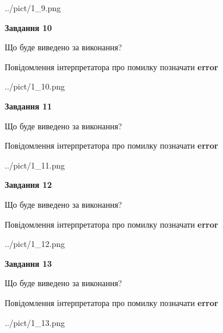 \documentclass[11pt, ukrainian]{article}
\begin{document}
{\begin {large}
\begin{center}
	{../pict/1_9.png}
\end{center}
\newpage

{\begin {center}\textbf{Завдання 10}\end {center}}\par
Що буде виведено за виконання? \par
Повідомлення інтерпретатора про помилку позначати \textbf{error}

\begin{center}
	{../pict/1_10.png}
\end{center}
\newpage

{\begin {center}\textbf{Завдання 11}\end {center}}\par
Що буде виведено за виконання? \par
Повідомлення інтерпретатора про помилку позначати \textbf{error}

\begin{center}
	{../pict/1_11.png}
\end{center}
\newpage

{\begin {center}\textbf{Завдання 12}\end {center}}\par
Що буде виведено за виконання? \par
Повідомлення інтерпретатора про помилку позначати \textbf{error}

\begin{center}
	{../pict/1_12.png}
\end{center}
\newpage

{\begin {center}\textbf{Завдання 13}\end {center}}\par
Що буде виведено за виконання? \par
Повідомлення інтерпретатора про помилку позначати \textbf{error}

\begin{center}
	{../pict/1_13.png}
\end{center}
\newpage


\end{large}}
\end{document}
